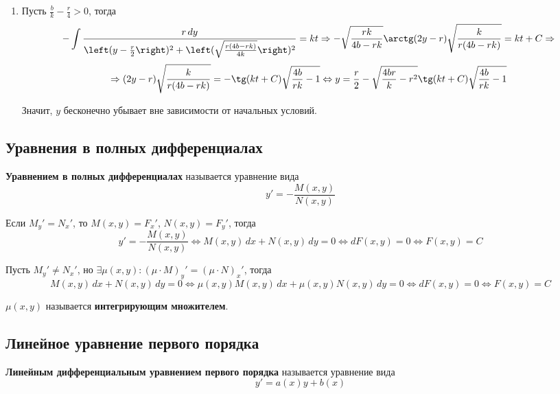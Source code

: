 \begin{enumerate}
	\item Пусть $\frac{b}k - \frac{r}4 > 0$, тогда
	\begin{equation*}
	-\int \frac{r\,dy}{\left( y - \frac{r}2 \right)^2 + \left( \sqrt\frac{r(4b - rk)}{4k} \right)^2} = kt \Rightarrow
	-\sqrt\frac{rk}{4b - rk} \arctg (2y - r)\sqrt\frac{k}{r(4b - rk)} = kt + C \Rightarrow
	\end{equation*}
	\begin{equation*}
	\Rightarrow (2y - r)\sqrt\frac{k}{r(4b - rk)} = -\tg (kt + C) \sqrt{\frac{4b}{rk} - 1} \Leftrightarrow
	y = \frac{r}2 - \sqrt{\frac{4br}{k} - r^2}\tg (kt + C) \sqrt{\frac{4b}{rk} - 1}
	\end{equation*}
	
	Значит, $y$ бесконечно убывает вне зависимости от начальных условий.
\end{enumerate}

\subsection{Уравнения в полных дифференциалах}
 \textbf{Уравнением в полных дифференциалах} называется уравнение вида
\begin{equation*}
y' = -\frac{M(x, y)}{N(x, y)}
\end{equation*}

Если $M_y' = N_x'$, то $M(x, y) = F_x'$, $N(x, y) = F_y'$, тогда
\begin{equation*}
y' = -\frac{M(x, y)}{N(x, y)} \Leftrightarrow
M(x, y)\,dx + N(x, y)\,dy = 0 \Leftrightarrow
dF(x, y) = 0 \Leftrightarrow
F(x, y) = C
\end{equation*}

Пусть $M_y' \neq N_x'$, но $\exists \mu(x, y) \colon (\mu \cdot M)_y' = (\mu \cdot N)_x'$, тогда
\begin{equation*}
M(x, y)\,dx + N(x, y)\,dy = 0 \Leftrightarrow
\mu(x, y) M(x, y)\,dx + \mu(x, y) N(x, y)\,dy = 0 \Leftrightarrow
dF(x, y) = 0 \Leftrightarrow
F(x, y) = C
\end{equation*}

 $\mu(x, y)$ называется \textbf{интегрирующим множителем}.

\subsection{Линейное уравнение первого порядка}
 \textbf{Линейным дифференциальным уравнением первого порядка} называется уравнение вида
\begin{equation*}
y' = a(x) y + b(x)
\end{equation*}

